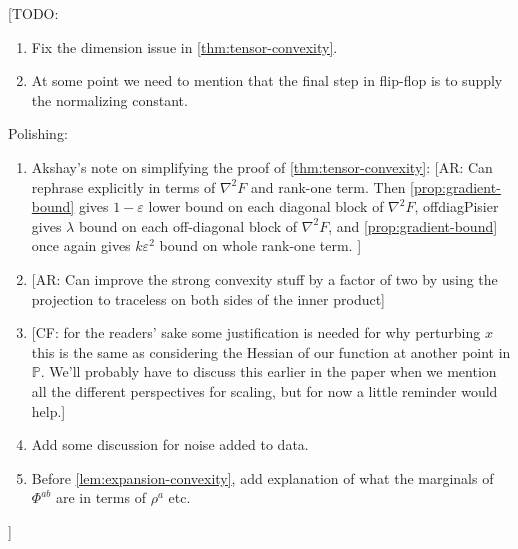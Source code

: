 \documentclass[aos]{imsart}
\theoremstyle{definition}
\numberwithin{equation}{section}
\newcommand{\eps}{\varepsilon}
\newcommand{\SPD}{\mathbb{P}}
\newcommand{\samp}{x}
\newcommand{\CF}[1]{{\color{purple}[CF: #1]}}
\newcommand{\AR}[1]{{\color{orange}[AR: #1]}}
\newcommand{\TODO}[1]{{\color{blue}[TODO: #1]}}
\begin{document}
\tableofcontents

\TODO{
\begin{enumerate}
\item Fix the dimension issue in \cref{thm:tensor-convexity}.
\item At some point we need to mention that the final step in flip-flop is to supply the normalizing constant.
\end{enumerate}
Polishing:
\begin{enumerate}
\item Akshay's note on simplifying the proof of \cref{thm:tensor-convexity}: \AR{Can rephrase explicitly in terms of $\nabla^{2} F$ and rank-one term. Then \cref{prop:gradient-bound} gives $1-\eps$ lower bound on each diagonal block of $\nabla^{2} F$, offdiagPisier gives $\lambda$ bound on each off-diagonal block of $\nabla^{2} F$, and \cref{prop:gradient-bound} once again gives $k \eps^{2}$ bound on whole rank-one term.  }
\item \AR{Can improve the strong convexity stuff by a factor of two by using the projection to traceless on both sides of the inner product}
\item \CF{for the readers' sake some justification is needed for why perturbing $\samp$ this is the same as considering the Hessian of our function at another point in $\SPD$. We'll probably have to discuss this earlier in the paper when we mention all the different perspectives for scaling, but for now a little reminder would help.}
\item Add some discussion for noise added to data.
\item Before \cref{lem:expansion-convexity}, add explanation of what the marginals of $\Phi^{ab}$ are in terms of $\rho^{a}$ etc.
\end{enumerate}
}


\end{document}
